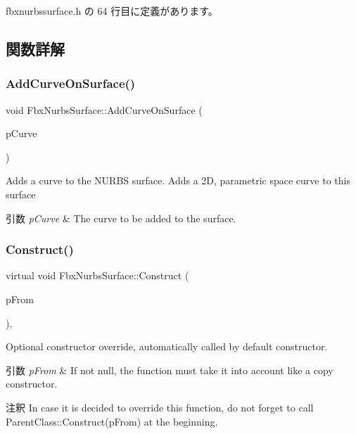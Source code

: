  fbxnurbssurface.\+h の 64 行目に定義があります。



\subsection{関数詳解}
\mbox{\label{class_fbx_nurbs_surface_a4e10c230bce83672fa38c0cb168f2aa6}} 
\subsubsection{\texorpdfstring{Add\+Curve\+On\+Surface()}{AddCurveOnSurface()}}
{\footnotesize\ttfamily void Fbx\+Nurbs\+Surface\+::\+Add\+Curve\+On\+Surface (\begin{DoxyParamCaption}\item[{\hyperlink{class_fbx_node}{Fbx\+Node} $\ast$}]{p\+Curve }\end{DoxyParamCaption})}

Adds a curve to the N\+U\+R\+BS surface. Adds a 2D, parametric space curve to this surface 
\begin{DoxyParams}{引数}
{\em p\+Curve} & The curve to be added to the surface. \\
\hline
\end{DoxyParams}
\mbox{\label{class_fbx_nurbs_surface_a3487d194007af1729d31dc9dfa0b12c9}} 
\subsubsection{\texorpdfstring{Construct()}{Construct()}}
{\footnotesize\ttfamily virtual void Fbx\+Nurbs\+Surface\+::\+Construct (\begin{DoxyParamCaption}\item[{const \hyperlink{class_fbx_object}{Fbx\+Object} $\ast$}]{p\+From }\end{DoxyParamCaption})\hspace{0.3cm}{\ttfamily [protected]}, {\ttfamily [virtual]}}

Optional constructor override, automatically called by default constructor. 
\begin{DoxyParams}{引数}
{\em p\+From} & If not null, the function must take it into account like a copy constructor. \\
\hline
\end{DoxyParams}
\begin{DoxyRemark}{注釈}
In case it is decided to override this function, do not forget to call Parent\+Class\+::\+Construct(p\+From) at the beginning. 
\end{DoxyRemark}


